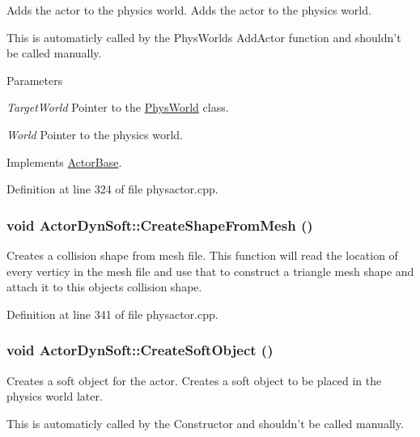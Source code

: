 Adds the actor to the physics world. Adds the actor to the physics world. \par
 This is automaticly called by the PhysWorlds AddActor function and shouldn't be called manually. 
\begin{DoxyParams}{Parameters}
\item[{\em TargetWorld}]Pointer to the \hyperlink{classPhysWorld}{PhysWorld} class. \item[{\em World}]Pointer to the physics world. \end{DoxyParams}


Implements \hyperlink{classActorBase_a1af82a2ed960fd114518fdf84d5ff146}{ActorBase}.

Definition at line 324 of file physactor.cpp.\hypertarget{classActorDynSoft_a979620b4ac447eb9875fb769d61a8092}{
\subsubsection[{CreateShapeFromMesh}]{\setlength{\rightskip}{0pt plus 5cm}void ActorDynSoft::CreateShapeFromMesh ()}}
\label{dc/de0/classActorDynSoft_a979620b4ac447eb9875fb769d61a8092}


Creates a collision shape from mesh file. This function will read the location of every verticy in the mesh file and use that to construct a triangle mesh shape and attach it to this objects collision shape. 

Definition at line 341 of file physactor.cpp.\hypertarget{classActorDynSoft_a249bc0621b1d55ea0a9c7787605078d6}{
\subsubsection[{CreateSoftObject}]{\setlength{\rightskip}{0pt plus 5cm}void ActorDynSoft::CreateSoftObject ()}}
\label{dc/de0/classActorDynSoft_a249bc0621b1d55ea0a9c7787605078d6}


Creates a soft object for the actor. Creates a soft object to be placed in the physics world later. \par
 This is automaticly called by the Constructor and shouldn't be called manually. 

